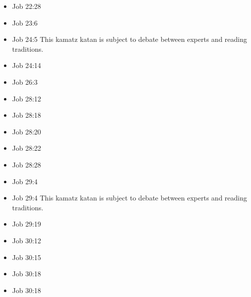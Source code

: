 \documentclass[14pt]{article}
\begin{document}
\begin{multicols}{2}
\begin{itemize}
															\item Job 22:28
															
															\item Job 23:6
															
															\item Job 24:5 This kamatz katan is subject to debate between experts and reading traditions.
															
															\item Job 24:14
															
															\item Job 26:3
															
															\item Job 28:12
															
															\item Job 28:18
															
															\item Job 28:20
															
															\item Job 28:22
															
															\item Job 28:28
															
															\item Job 29:4
															
															\item Job 29:4 This kamatz katan is subject to debate between experts and reading traditions.
															
															\item Job 29:19
															
															\item Job 30:12
															
															\item Job 30:15
															
															\item Job 30:18
															
															\item Job 30:18
															

\end{itemize}
\end{multicols}
\end{document}
